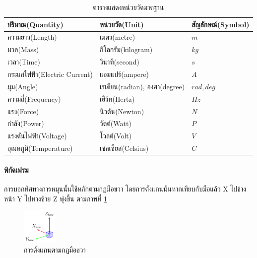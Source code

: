 \begin{table}[htbp]
	\centering
	\begin{tabular}{| l | l | l |}
		\hline
		ปริมาณ(Quantity)                     & หน่วยวัด(Unit)                      & สัญลักษณ์(Symbol) \\
		\hline
		ความยาว(Length)                    & เมตร(metre)                                 & $m$                                 \\
		มวล(Mass)                                  & กิโลกรัม(kilogram)                  & $kg$                                \\
		เวลา(Time)                               & วินาที(second)                          & $s$                                 \\
		กระแสไฟฟ้า(Electric Current) & แอมแปร์(ampere)                       & $A$                                 \\
		มุม(Angle)                                 & เรเดียน(radian), องศา(degree) & $rad, deg$                          \\
		ความถี่(Frequency)                 & เฮิร์ท(Hertz)                           & $Hz$                                \\
		แรง(Force)                                 & นิวตัน(Newton)                          & $N$                                 \\
		กำลัง(Power)                           & วัตต์(Watt)                               & $P$                                 \\
		แรงดันไฟฟ้า(Voltage)       & โวลต์(Volt)                               & $V$                                 \\
		อุณหภูมิ(Temperature)            & เซลเซียส(Celsius)                   & $C$                                 \\
		\hline
	\end{tabular}
	\caption{ตารางแสดงหน่วยวัดมาตฐาน}
	\label{tab:abc}
\end{table}

\paragraph*{พิกัดเฟรม}
การบอกทิศทางการหมุนนั้นใช้หลักตามกฏมือขวา โดยการตั้งแกนนั้นหากเทียบกับมือแล้ว X ไปข้างหน้า Y ไปทางซ้าย Z พุ่งขึ้น ตามภาพที่ \ref{fig:right_hand_rule}
\begin{figure}[htbp]
	\centering
	\includegraphics[width=0.15\textwidth]{chapter2/images/right_hand_rule.png}
	\caption{การตั้งแกนตามกฏมือขวา}
	\label{fig:right_hand_rule}
\end{figure}